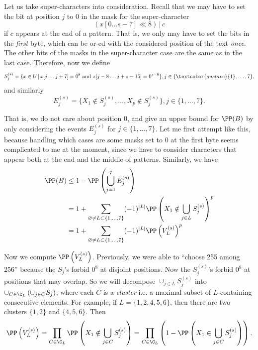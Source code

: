 Let us take super-characters into consideration. Recall that we may have to set the bit at position $j$ to $0$ in the mask for the super-character
$$(x[0\ldots s-7]\ll 8) \,|\, c$$ if $c$ appears at the end of a pattern. That is, we only may have to set the bits in the \textit{first} byte, which can be or-ed with the considered position of the text \textit{once}. The other bits of the masks in the super-character case are the same as in the last case. Therefore, now we define
$$S^{(s)}_j=\{x\in U\,|\, x[j\ldots j+7] = 0^8 \text{ and } x[j-8\ldots j+s-15] = 0^{s-8}\}, j\in\{\textcolor{gustave}{1},\ldots, 7\},$$
and similarly
$$E^{(s)}_j=\{X_1\notin S^{(s)}_j,\ldots, X_p\notin S^{(s)}_j\}, j\in\{1,\ldots, 7\}.$$

That is, we do not care about position $0$, and give an upper bound for $\PP(B)$ by only considering the events $E^{(s)}_j$ for $j\in\{1,\ldots, 7\}$. Let me first attempt like this, because handling which cases are some masks set to $0$ at the first byte seems complicated to me at the moment, since we have to consider characters that appear both at the end and the middle of patterns. Similarly, we have
\begin{align*}
  \PP(B)
   & \le 1-\PP\left(\bigcup_{j=1}^7 E^{(s)}_j\right)                                                                       \\
   & = 1+ \sum_{\varnothing\ne L \subset \{1,\ldots, 7\}} (-1)^{|L|}\PP\left(X_1\notin \bigcup_{j\in L} S^{(s)}_j\right)^p \\
   & = 1+ \sum_{\varnothing\ne L \subset \{1,\ldots, 7\}} (-1)^{|L|}\PP\left(V^{(s)}_L\right)^p
\end{align*}

Now we compute $\PP\left(V^{(s)}_L\right)$. Previously, we were able to ``choose 255 among 256'' because the $S_j$'s forbid $0^8$ at disjoint positions. Now the $S^{(s)}_j$'s forbid $0^8$ at positions that may overlap. So we will decompose $\cup_{j\in L} S^{(s)}_j$ into $\cup_{C\in\C_L}\left(\cup_{j\in C} S_j\right)$, where each $C$ is a \textit{cluster} i.e. a maximal subset of $L$ containing consecutive elements. For example, if $L=\{1,2,4,5,6\}$, then there are two clusters $\{1,2\}$ and $\{4,5,6\}$. Then
$$\PP\left(V^{(s)}_L\right) = \prod_{C\in\C_L}\PP\left(X_1\notin \bigcup_{j\in C} S^{(s)}_j\right) = \prod_{C\in\C_L}\left(1-\PP\left(X_1\in \bigcup_{j\in C} S^{(s)}_j\right)\right).$$

